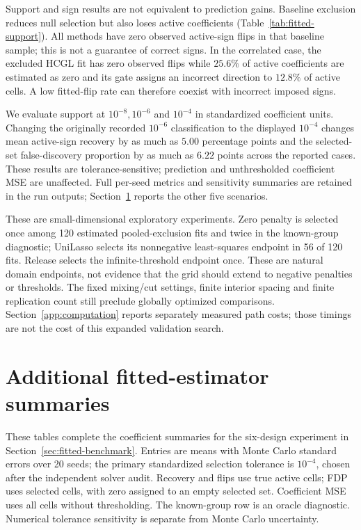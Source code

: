 \documentclass[11pt,a4paper]{article}
\begin{document}
Support and sign results are not equivalent to prediction gains.
Baseline exclusion reduces null selection but also loses active coefficients
(Table~\ref{tab:fitted-support}). All methods have zero observed active-sign
flips in that baseline sample; this is not a guarantee of correct signs.
In the correlated case, the excluded HCGL fit has zero observed flips
while $25.6\%$ of active coefficients are estimated as zero and its gate
assigns an incorrect direction to $12.8\%$ of active cells.
A low fitted-flip rate can therefore coexist with incorrect imposed signs.

We evaluate support at $10^{-8},10^{-6}$ and $10^{-4}$ in standardized
coefficient units. Changing the originally recorded $10^{-6}$ classification to the displayed $10^{-4}$
changes mean active-sign recovery by as much as $5.00$ percentage points
and the selected-set false-discovery proportion by as much as $6.22$
points across the reported cases. These results are tolerance-sensitive;
prediction and unthresholded coefficient MSE are unaffected. Full
per-seed metrics and sensitivity summaries are retained in the run outputs;
Section~\ref{app:estimator-metrics} reports the other five scenarios.

These are small-dimensional exploratory experiments. Zero penalty is selected
once among 120 estimated pooled-exclusion fits and twice in the known-group
diagnostic; UniLasso selects its nonnegative least-squares endpoint in 56 of
120 fits. Release selects the infinite-threshold endpoint once. These are
natural domain endpoints, not evidence that the grid should extend to negative
penalties or thresholds. The fixed mixing/cut settings, finite interior spacing
and finite replication count still preclude globally optimized comparisons.
Section~\ref{app:computation} reports separately measured path costs; those
timings are not the cost of this expanded validation search.


\section{Additional fitted-estimator summaries}\label{app:estimator-metrics}
These tables complete the coefficient summaries for the six-design experiment
in Section~\ref{sec:fitted-benchmark}. Entries are means with Monte Carlo
standard errors over 20 seeds; the primary standardized selection tolerance
is $10^{-4}$, chosen after the independent solver audit. Recovery and flips use true active cells; FDP uses selected
cells, with zero assigned to an empty selected set. Coefficient MSE uses all
cells without thresholding. The known-group row is an oracle diagnostic.
Numerical tolerance sensitivity is separate from Monte Carlo uncertainty.
\end{document}
